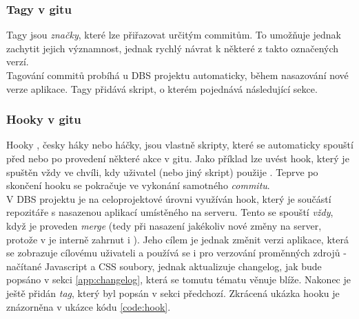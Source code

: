 \subsubsection{Tagy v gitu} \label{version:git:tag}
Tagy \cite{tags} jsou \emph{značky}, které lze přiřazovat určitým commitům. To umožňuje jednak zachytit jejich významnost, jednak rychlý návrat k některé z takto označených verzí.\\
Tagování commitů probíhá u DBS projektu automaticky, během nasazování nové verze aplikace. Tagy přidává skript, o kterém pojednává následující sekce.

\subsubsection{Hooky v gitu} \label{version:git:hook}
Hooky \cite{hooks}, česky háky nebo háčky, jsou vlastně skripty, které se automaticky spouští před nebo po provedení některé akce v gitu. Jako příklad lze uvést  hook, který je spuštěn vždy ve chvíli, kdy uživatel (nebo jiný skript) použije . Teprve po skončení  hooku se pokračuje ve vykonání samotného \emph{commitu}.\\
V DBS projektu je na celoprojektové úrovni využíván  hook, který je součástí repozitáře s nasazenou aplikací umístěného na serveru. Tento se spouští \emph{vždy}, když je proveden \emph{merge} (tedy při nasazení jakékoliv nové změny na server, protože v  je interně zahrnut i ). Jeho cílem je jednak změnit verzi aplikace, která se zobrazuje cílovému uživateli a používá se i pro verzování proměnných zdrojů - načítané Javascript a CSS soubory, jednak aktualizuje changelog, jak bude popsáno v sekci \ref{app:changelog}, která se tomutu tématu věnuje blíže. Nakonec je ještě přidán \emph{tag}, který byl popsán v sekci předchozí. Zkrácená ukázka  hooku je znázorněna v ukázce kódu \ref{code:hook}.
